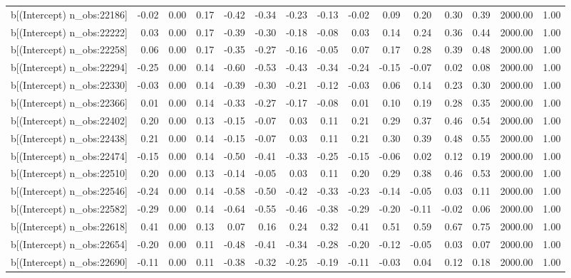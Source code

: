\begin{table}[ht]
\begin{tabular}{rrrrrrrrrrrrrrr}
  b[(Intercept) n\_obs:22186] & -0.02 & 0.00 & 0.17 & -0.42 & -0.34 & -0.23 & -0.13 & -0.02 & 0.09 & 0.20 & 0.30 & 0.39 & 2000.00 & 1.00 \\ 
  b[(Intercept) n\_obs:22222] & 0.03 & 0.00 & 0.17 & -0.39 & -0.30 & -0.18 & -0.08 & 0.03 & 0.14 & 0.24 & 0.36 & 0.44 & 2000.00 & 1.00 \\ 
  b[(Intercept) n\_obs:22258] & 0.06 & 0.00 & 0.17 & -0.35 & -0.27 & -0.16 & -0.05 & 0.07 & 0.17 & 0.28 & 0.39 & 0.48 & 2000.00 & 1.00 \\ 
  b[(Intercept) n\_obs:22294] & -0.25 & 0.00 & 0.14 & -0.60 & -0.53 & -0.43 & -0.34 & -0.24 & -0.15 & -0.07 & 0.02 & 0.08 & 2000.00 & 1.00 \\ 
  b[(Intercept) n\_obs:22330] & -0.03 & 0.00 & 0.14 & -0.39 & -0.30 & -0.21 & -0.12 & -0.03 & 0.06 & 0.14 & 0.23 & 0.30 & 2000.00 & 1.00 \\ 
  b[(Intercept) n\_obs:22366] & 0.01 & 0.00 & 0.14 & -0.33 & -0.27 & -0.17 & -0.08 & 0.01 & 0.10 & 0.19 & 0.28 & 0.35 & 2000.00 & 1.00 \\ 
  b[(Intercept) n\_obs:22402] & 0.20 & 0.00 & 0.13 & -0.15 & -0.07 & 0.03 & 0.11 & 0.21 & 0.29 & 0.37 & 0.46 & 0.54 & 2000.00 & 1.00 \\ 
  b[(Intercept) n\_obs:22438] & 0.21 & 0.00 & 0.14 & -0.15 & -0.07 & 0.03 & 0.11 & 0.21 & 0.30 & 0.39 & 0.48 & 0.55 & 2000.00 & 1.00 \\ 
  b[(Intercept) n\_obs:22474] & -0.15 & 0.00 & 0.14 & -0.50 & -0.41 & -0.33 & -0.25 & -0.15 & -0.06 & 0.02 & 0.12 & 0.19 & 2000.00 & 1.00 \\ 
  b[(Intercept) n\_obs:22510] & 0.20 & 0.00 & 0.13 & -0.14 & -0.05 & 0.03 & 0.11 & 0.20 & 0.29 & 0.38 & 0.46 & 0.53 & 2000.00 & 1.00 \\ 
  b[(Intercept) n\_obs:22546] & -0.24 & 0.00 & 0.14 & -0.58 & -0.50 & -0.42 & -0.33 & -0.23 & -0.14 & -0.05 & 0.03 & 0.11 & 2000.00 & 1.00 \\ 
  b[(Intercept) n\_obs:22582] & -0.29 & 0.00 & 0.14 & -0.64 & -0.55 & -0.46 & -0.38 & -0.29 & -0.20 & -0.11 & -0.02 & 0.06 & 2000.00 & 1.00 \\ 
  b[(Intercept) n\_obs:22618] & 0.41 & 0.00 & 0.13 & 0.07 & 0.16 & 0.24 & 0.32 & 0.41 & 0.51 & 0.59 & 0.67 & 0.75 & 2000.00 & 1.00 \\ 
  b[(Intercept) n\_obs:22654] & -0.20 & 0.00 & 0.11 & -0.48 & -0.41 & -0.34 & -0.28 & -0.20 & -0.12 & -0.05 & 0.03 & 0.07 & 2000.00 & 1.00 \\ 
  b[(Intercept) n\_obs:22690] & -0.11 & 0.00 & 0.11 & -0.38 & -0.32 & -0.25 & -0.19 & -0.11 & -0.03 & 0.04 & 0.12 & 0.18 & 2000.00 & 1.00 \\ 

\end{tabular}
\end{table}
